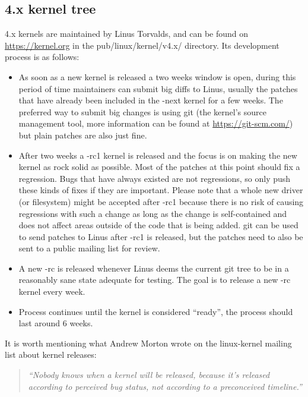 \documentclass[a4paper,8pt,english]{sphinxmanual}
\begin{document}
\subsection{4.x kernel tree}
\label{process/howto:x-kernel-tree}
4.x kernels are maintained by Linus Torvalds, and can be found on
\href{https://kernel.org}{https://kernel.org} in the pub/linux/kernel/v4.x/ directory.  Its development
process is as follows:
\begin{itemize}
\item {} 
As soon as a new kernel is released a two weeks window is open,
during this period of time maintainers can submit big diffs to
Linus, usually the patches that have already been included in the
-next kernel for a few weeks.  The preferred way to submit big changes
is using git (the kernel's source management tool, more information
can be found at \href{https://git-scm.com/}{https://git-scm.com/}) but plain patches are also just
fine.

\item {} 
After two weeks a -rc1 kernel is released and the focus is on making the
new kernel as rock solid as possible.  Most of the patches at this point
should fix a regression.  Bugs that have always existed are not
regressions, so only push these kinds of fixes if they are important.
Please note that a whole new driver (or filesystem) might be accepted
after -rc1 because there is no risk of causing regressions with such a
change as long as the change is self-contained and does not affect areas
outside of the code that is being added.  git can be used to send
patches to Linus after -rc1 is released, but the patches need to also be
sent to a public mailing list for review.

\item {} 
A new -rc is released whenever Linus deems the current git tree to
be in a reasonably sane state adequate for testing.  The goal is to
release a new -rc kernel every week.

\item {} 
Process continues until the kernel is considered ``ready'', the
process should last around 6 weeks.

\end{itemize}

It is worth mentioning what Andrew Morton wrote on the linux-kernel
mailing list about kernel releases:
\begin{quote}

\emph{``Nobody knows when a kernel will be released, because it's
released according to perceived bug status, not according to a
preconceived timeline.''}
\end{quote}
\end{document}
